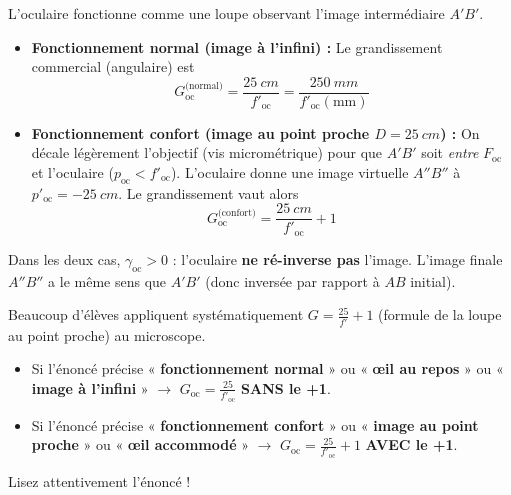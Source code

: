 \documentclass[11pt]{article}
\newcommand{\cle}[1]{{\popxbold\color{popdark}#1}}
\begin{document}
\begin{propriete}
L'oculaire fonctionne comme une loupe observant l'image intermédiaire $A'B'$.
\begin{itemize}
    \item \textbf{Fonctionnement normal (image à l'infini) :} Le \cle{grandissement commercial} (angulaire) est
    \[
    G_{\text{oc}}^{\text{(normal)}} = \frac{\SI{25}{cm}}{f'_{\text{oc}}} = \frac{\SI{250}{mm}}{f'_{\text{oc}}(\text{mm})}
    \]
    \item \textbf{Fonctionnement confort (image au point proche $D = \SI{25}{cm}$) :} On décale légèrement l'objectif (vis micrométrique) pour que $A'B'$ soit \emph{entre} $F_{\text{oc}}$ et l'oculaire ($p_{\text{oc}} < f'_{\text{oc}}$). L'oculaire donne une image virtuelle $A''B''$ à $p'_{\text{oc}} = -\SI{25}{cm}$. Le grandissement vaut alors
    \[
    G_{\text{oc}}^{\text{(confort)}} = \frac{\SI{25}{cm}}{f'_{\text{oc}}} + 1
    \]
\end{itemize}
Dans les deux cas, $\gamma_{\text{oc}} > 0$ : l'oculaire \textbf{ne ré-inverse pas} l'image. L'image finale $A''B''$ a le même sens que $A'B'$ (donc inversée par rapport à $AB$ initial).
\end{propriete}

\begin{attention}
Beaucoup d'élèves appliquent systématiquement $G = \frac{25}{f'} + 1$ (formule de la loupe au point proche) au microscope.
\begin{itemize}
    \item Si l'énoncé précise « \textbf{fonctionnement normal} » ou « \textbf{œil au repos} » ou « \textbf{image à l'infini} » $\rightarrow$ $G_{\text{oc}} = \frac{25}{f'_{\text{oc}}}$ \textbf{SANS le +1}.
    \item Si l'énoncé précise « \textbf{fonctionnement confort} » ou « \textbf{image au point proche} » ou « \textbf{œil accommodé} » $\rightarrow$ $G_{\text{oc}} = \frac{25}{f'_{\text{oc}}} + 1$ \textbf{AVEC le +1}.
\end{itemize}
Lisez attentivement l'énoncé !
\end{attention}
\end{document}
